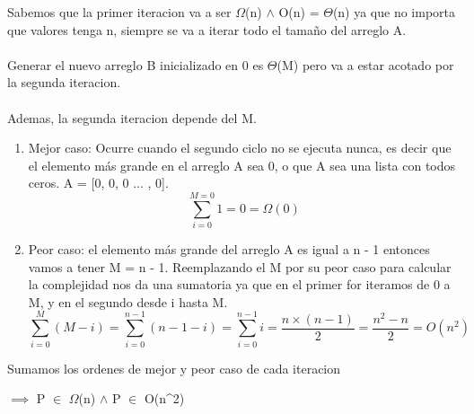 \documentclass[10pt, a4paper]{article}
\begin{document}
Sabemos que la primer iteracion va a ser $\Omega$(n) $\land$ O(n) = $\Theta$(n) ya que no importa que valores tenga n, siempre se va a iterar todo el tama\~no del arreglo A.
\\ \\
Generar el nuevo arreglo B inicializado en 0 es $\Theta$(M) pero va a estar acotado por la segunda iteracion.
\\ \\
Ademas, la segunda iteracion depende del M.
\begin{enumerate}
  \item Mejor caso: Ocurre cuando el segundo ciclo no se ejecuta nunca, es decir que el elemento m\'as grande en el arreglo A sea 0, o que A sea una lista con todos ceros. A = [0, 0, 0 ... , 0].
  $$\sum_{i=0}^{M=0} 1 = 0 = \Omega(0)$$
  \item Peor caso: el elemento m\'as grande del arreglo A es igual a n - 1 entonces vamos a tener M = n - 1. Reemplazando el M por su peor caso para calcular la complejidad nos da una sumatoria ya que en el primer for iteramos de 0 a M, y en el segundo desde i hasta M.
  $$\sum_{i=0}^{M} (M - i) = \sum_{i=0}^{n-1} (n - 1 - i) = \sum_{i=0}^{n - 1} i = \frac{n \times (n - 1)}{2} = \frac{n^2 - n}{2} = O(n^2)$$
\end{enumerate}

Sumamos los ordenes de mejor y peor caso de cada iteracion

$\implies$ P $\in$ $\Omega$(n) $\land$ P $\in$ O(n^2)
\\
\end{document}
